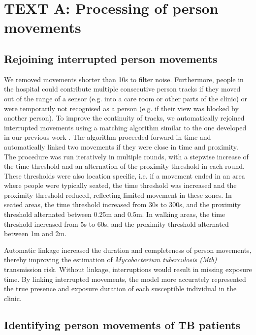 \documentclass[11pt]{article}
\begin{document}
\section{TEXT A: Processing of person movements}\label{text-a}

\subsection{Rejoining interrupted person movements}\label{rejoining-interrupted-person-movements}

We removed movements shorter than 10s to filter noise. Furthermore, people in the hospital could contribute multiple consecutive person tracks if they moved out of the range of a sensor (e.g. into a care room or other parts of the clinic) or were temporarily not recognised as a person (e.g. if their view was blocked by another person). To improve the continuity of tracks, we automatically rejoined interrupted movements using a matching algorithm similar to the one developed in our previous work \cite{banholzer2025PLOSComputBiol}. The algorithm proceeded forward in time and automatically linked two movements if they were close in time and proximity. The procedure was run iteratively in multiple rounds, with a stepwise increase of the time threshold and an alternation of the proximity threshold in each round. These thresholds were also location specific, i.e. if a movement ended in an area where people were typically seated, the time threshold was increased and the proximity threshold reduced, reflecting limited movement in these zones. In seated areas, the time threshold increased from 30s to 300s, and the proximity threshold alternated between 0.25m and 0.5m. In walking areas, the time threshold increased from 5s to 60s, and the proximity threshold alternated between 1m and 2m.

Automatic linkage increased the duration and completeness of person movements, thereby improving the estimation of \emph{Mycobacterium tuberculosis (Mtb)} transmission risk. Without linkage, interruptions would result in missing exposure time. By linking interrupted movements, the model more accurately represented the true presence and exposure duration of each susceptible individual in the clinic.

\subsection{Identifying person movements of TB patients}\label{identifying-person-movements-of-tb-patients}
\end{document}
